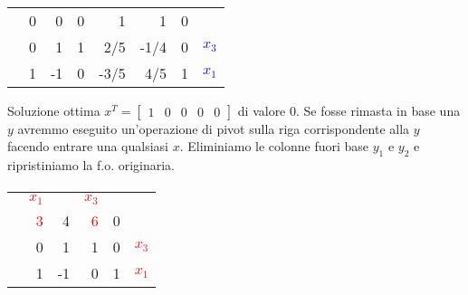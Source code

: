 \documentclass{article}
\begin{document}
\begin{preview}
                \paragraph{}
                \begin{tabular}{r | r r r r r | r | r}
                        \cline{2-7}
                        & 0 & 0 & 0 & 1 & 1 & 0 & \\
                        \cline{2-7}
                        & 0 & 1 & 1 & 2/5 & -1/4 & 0 & \textcolor{blue}{ $ x_3 $ } \\
                        & 1 & -1 & 0 & -3/5 & 4/5 & 1 & \textcolor{blue}{$ x_1 $ } \\
                        \cline{2-7}
                \end{tabular}

                \begin{center}
                        \parbox{0.9 \linewidth} {
                                {\scriptsize
                                        \hfill\newline
                                        Soluzione ottima
                                        { \setlength{\arraycolsep}{3pt} $ x^T = \begin{bmatrix} 1 & 0 & 0 & 0 & 0 \end{bmatrix} $ } di valore 0. \newline
                                        Se fosse rimasta in base una $ y $ avremmo eseguito un'operazione di pivot sulla riga corrispondente alla $ y $ facendo entrare una qualsiasi $ x $. \newline
                                        \hfill\newline
                                        Eliminiamo le colonne fuori base $ y_1 $ e $ y_2 $ \newline
                                        e ripristiniamo la f.o. originaria.
                                }
                        }
                \end{center}

                \paragraph{}
                \begin{tabular}{r | r r r | r | r}
                        \multicolumn{1}{r}{} & \textcolor{red}{ $ x_1 $ } & & \multicolumn{1}{r}{\textcolor{red}{ $ x_3 $}}  \\
                        \cline{2-5}
                        & \textcolor{red}{3} & 4 & \textcolor{red}{6} & 0 & \\
                        \cline{2-5}
                        & 0 & 1 & 1 & 0 & \textcolor{red}{ $ x_3 $ } \\
                        & 1 & -1 & 0 & 1 & \textcolor{red}{ $ x_1 $ } \\
                        \cline{2-5}
                \end{tabular}


\end{preview}
\end{document}
